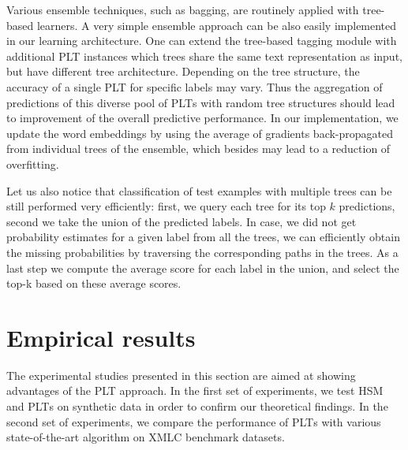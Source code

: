 \documentclass{article}
\newcommand{\Algo}[1]{\textsc{#1}}
\newcommand{\sectionBefore}{-0pt}
\newcommand{\sectionAfter}{-0pt}
\begin{document}
Various ensemble techniques, such as bagging, are routinely applied with tree-based learners. A very simple ensemble approach can be also easily implemented in our learning architecture. One can extend the tree-based tagging module with additional \Algo{PLT} instances which trees share the same text representation as input, but have different tree architecture. Depending on the tree structure, the accuracy of a single \Algo{PLT} for specific labels may vary. Thus the aggregation of predictions of this diverse pool of \Algo{PLT}s with random tree structures should lead to improvement of the overall predictive performance. 
%
In our implementation, we update the word embeddings by using %
the average of gradients back-propagated from individual trees of the ensemble, which besides may lead to a reduction of overfitting.

Let us also notice that classification of test examples with multiple trees can be still performed very efficiently: first, we query each tree for its top $k$ predictions, second we take the union of the predicted labels. In case, we did not get probability estimates for a given label from all the trees, we can efficiently obtain the missing probabilities by traversing the corresponding paths in the trees. As a last step we compute the average score for each label in the union, and select the top-k based on these average scores.



\vspace{\sectionBefore}
\section{Empirical results}
\label{sec:empirical_results}
\vspace{\sectionAfter}

The experimental studies presented in this section are aimed at showing advantages of the \Algo{PLT} approach. In the first set of experiments, we test \Algo{HSM} and \Algo{PLT}s on synthetic data in order to confirm our theoretical findings. In the second set of experiments, we compare the performance of \Algo{PLT}s with various state-of-the-art algorithm on XMLC benchmark datasets.
\end{document}
